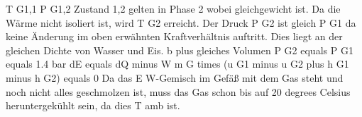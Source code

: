 T G1,1 P G1,2  
Zustand 1,2 gelten in Phase 2 wobei gleichgewicht ist. Da die Wärme nicht isoliert ist, wird T G2 erreicht.  
Der Druck P G2 ist gleich P G1 da keine Änderung im oben erwähnten Kraftverhältnis auftritt. Dies liegt an der gleichen Dichte von Wasser und Eis.  
b plus gleiches Volumen  
P G2 equals P G1 equals 1.4 bar  
dE equals dQ minus W  
m G times (u G1 minus u G2 plus h G1 minus h G2) equals 0  
Da das E W-Gemisch im Gefäß mit dem Gas steht und noch nicht alles geschmolzen ist, muss das Gas schon bis auf 20 degrees Celsius heruntergekühlt sein, da dies T amb ist.